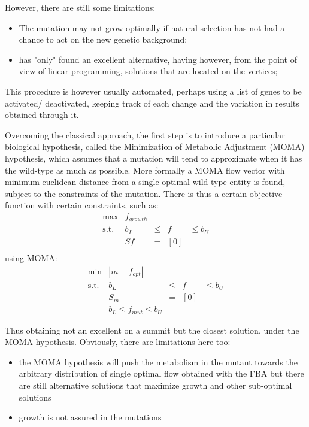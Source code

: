 However, there are still some limitations:
\begin{itemize}
    \item The mutation may not grow optimally if natural selection has not had a chance to act on the new genetic background;
    \item has "only" found an excellent alternative, having however, from the point of view of linear programming, solutions that are located on the vertices;
\end{itemize}
This procedure is however usually automated, perhaps using a list of genes to be activated/
deactivated, keeping track of each change and the variation in results obtained through it.

Overcoming the classical approach, the first step is to introduce a particular biological 
hypothesis, called the Minimization of Metabolic Adjustment (MOMA) hypothesis, which assumes 
that a mutation will tend to approximate when it has the wild-type as much as possible. More 
formally a MOMA flow vector with minimum euclidean distance from a single optimal wild-type 
entity is found, subject to the constraints of the mutation. There is thus a certain objective 
function with certain constraints, such as:
\begin{equation}
  \begin{array}{rrclcl}
    \displaystyle \max & f_{growth} \\
    \textrm{s.t.} & b_L & \leq & f & \leq b_{U} \\
                    & Sf & = & [0] \\
  \end{array}
\end{equation}
using MOMA:
\begin{equation}
  \begin{array}{rrclcl}
    \displaystyle \min & |m -f_{opt}| \\
    \textrm{s.t.} & b_L & \leq & f & \leq b_U \\
                    & S_m & = & [0] \\
                    & b_L \leq f_{mut} \leq b_U
  \end{array}
\end{equation}

Thus obtaining not an excellent on a summit but the closest solution, under the MOMA hypothesis. Obviously, there are limitations here too:
\begin{itemize}
    \item the MOMA hypothesis will push the metabolism in the mutant towards the arbitrary distribution of single optimal flow obtained with the FBA but there are still alternative solutions that maximize growth and other sub-optimal solutions
    \item growth is not assured in the mutations
\end{itemize}

